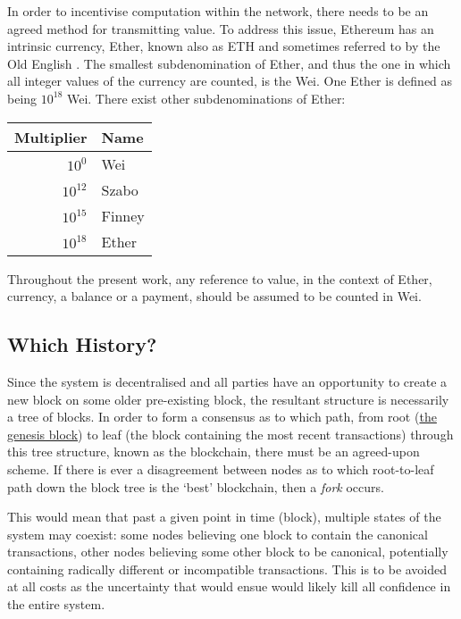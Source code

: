 \documentclass[9pt,oneside]{amsart}
\begin{document}
\begin{multicols}{2}
In order to incentivise computation within the network, there needs to be an agreed method for transmitting value. To address this issue, Ethereum has an intrinsic currency, Ether, known also as {\small ETH} and sometimes referred to by the Old English \DH{}. The smallest subdenomination of Ether, and thus the one in which all integer values of the currency are counted, is the Wei. One Ether is defined as being $10^{18}$ Wei. There exist other subdenominations of Ether:
\par
\begin{center}
\begin{tabular}{rl}
\toprule
Multiplier & Name \\
\midrule
$10^0$ & Wei \\
$10^{12}$ & Szabo \\
$10^{15}$ & Finney \\
$10^{18}$ & Ether \\
\bottomrule
\end{tabular}
\end{center}
\par

Throughout the present work, any reference to value, in the context of Ether, currency, a balance or a payment, should be assumed to be counted in Wei.

\subsection{Which History?}

Since the system is decentralised and all parties have an opportunity to create a new block on some older pre-existing block, the resultant structure is necessarily a tree of blocks. In order to form a consensus as to which path, from root (\hyperlink{GenesisBlock}{the genesis block}) to leaf (the block containing the most recent transactions) through this tree structure, known as the blockchain, there must be an agreed-upon scheme. If there is ever a disagreement between nodes as to which root-to-leaf path down the block tree is the `best' blockchain, then a \textit{fork} occurs.

This would mean that past a given point in time (block), multiple states of the system may coexist: some nodes believing one block to contain the canonical transactions, other nodes believing some other block to be canonical, potentially containing radically different or incompatible transactions. This is to be avoided at all costs as the uncertainty that would ensue would likely kill all confidence in the entire system.


\end{multicols}
\end{document}
